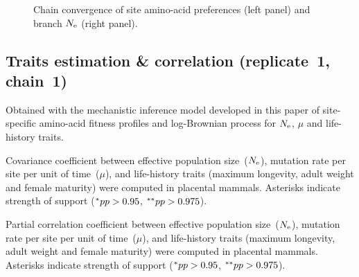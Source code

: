 \documentclass{article}
\begin{document}
\begin{figure}[H]
\begin{minipage}{0.49\linewidth}
		\end{minipage}
		\caption[Chain convergence of site profiles and branche $\Ne$]{
		Chain convergence of site amino-acid preferences (left panel) and branch $\Ne$ (right panel).}
	\end{figure}

	\subsection{Traits estimation \& correlation (replicate~1, chain~1)}
	Obtained with the mechanistic inference model developed in this paper of site-specific amino-acid fitness profiles and log-Brownian process for $\Ne$, $\mu$ and life-history traits.

	\begin{table}[H]
		
		\caption[Covariance matrix in mammals]{
		Covariance coefficient between effective population size~($\Ne$), mutation rate per site per unit of time~($\mu$), and life-history traits (maximum longevity, adult weight and female maturity) were computed in placental mammals.
		Asterisks indicate strength of support ($\smash{^{*}} pp > 0.95$, $\smash{^{**}} pp > 0.975$).}
	\end{table}

	\begin{table}[H]
		
		\caption[Partial correlation coefficient matrix in mammals]{
		Partial correlation coefficient between effective population size~($\Ne$), mutation rate per site per unit of time~($\mu$), and life-history traits (maximum longevity, adult weight and female maturity) were computed in placental mammals.
		Asterisks indicate strength of support ($\smash{^{*}} pp > 0.95$, $\smash{^{**}} pp > 0.975$).}
		\label{tab:table-partcor-mammals}
	\end{table}
\end{document}
